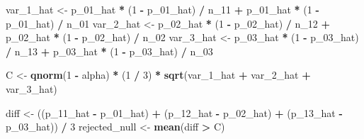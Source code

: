 \documentclass[
]{article}
\newenvironment{Shaded}{\begin{snugshade}}{\end{snugshade}}
\newcommand{\DecValTok}[1]{\textcolor[rgb]{0.00,0.00,0.81}{#1}}
\newcommand{\KeywordTok}[1]{\textcolor[rgb]{0.13,0.29,0.53}{\textbf{#1}}}
\newcommand{\NormalTok}[1]{#1}
\newcommand{\OperatorTok}[1]{\textcolor[rgb]{0.81,0.36,0.00}{\textbf{#1}}}
\newcommand{\StringTok}[1]{\textcolor[rgb]{0.31,0.60,0.02}{#1}}
\begin{document}
\begin{Shaded}
\begin{Highlighting}[]
\NormalTok{var_}\DecValTok{1}\NormalTok{_hat <-}\StringTok{ }\NormalTok{p_}\DecValTok{01}\NormalTok{_hat }\OperatorTok{*}\StringTok{ }\NormalTok{(}\DecValTok{1} \OperatorTok{-}\StringTok{ }\NormalTok{p_}\DecValTok{01}\NormalTok{_hat) }\OperatorTok{/}\StringTok{ }\NormalTok{n_}\DecValTok{11} \OperatorTok{+}\StringTok{ }\NormalTok{p_}\DecValTok{01}\NormalTok{_hat }\OperatorTok{*}\StringTok{ }\NormalTok{(}\DecValTok{1} \OperatorTok{-}\StringTok{ }\NormalTok{p_}\DecValTok{01}\NormalTok{_hat) }\OperatorTok{/}\StringTok{ }\NormalTok{n_}\DecValTok{01}
\NormalTok{var_}\DecValTok{2}\NormalTok{_hat <-}\StringTok{ }\NormalTok{p_}\DecValTok{02}\NormalTok{_hat }\OperatorTok{*}\StringTok{ }\NormalTok{(}\DecValTok{1} \OperatorTok{-}\StringTok{ }\NormalTok{p_}\DecValTok{02}\NormalTok{_hat) }\OperatorTok{/}\StringTok{ }\NormalTok{n_}\DecValTok{12} \OperatorTok{+}\StringTok{ }\NormalTok{p_}\DecValTok{02}\NormalTok{_hat }\OperatorTok{*}\StringTok{ }\NormalTok{(}\DecValTok{1} \OperatorTok{-}\StringTok{ }\NormalTok{p_}\DecValTok{02}\NormalTok{_hat) }\OperatorTok{/}\StringTok{ }\NormalTok{n_}\DecValTok{02}
\NormalTok{var_}\DecValTok{3}\NormalTok{_hat <-}\StringTok{ }\NormalTok{p_}\DecValTok{03}\NormalTok{_hat }\OperatorTok{*}\StringTok{ }\NormalTok{(}\DecValTok{1} \OperatorTok{-}\StringTok{ }\NormalTok{p_}\DecValTok{03}\NormalTok{_hat) }\OperatorTok{/}\StringTok{ }\NormalTok{n_}\DecValTok{13} \OperatorTok{+}\StringTok{ }\NormalTok{p_}\DecValTok{03}\NormalTok{_hat }\OperatorTok{*}\StringTok{ }\NormalTok{(}\DecValTok{1} \OperatorTok{-}\StringTok{ }\NormalTok{p_}\DecValTok{03}\NormalTok{_hat) }\OperatorTok{/}\StringTok{ }\NormalTok{n_}\DecValTok{03}

\NormalTok{C <-}\StringTok{ }\KeywordTok{qnorm}\NormalTok{(}\DecValTok{1} \OperatorTok{-}\StringTok{ }\NormalTok{alpha) }\OperatorTok{*}\StringTok{ }\NormalTok{(}\DecValTok{1} \OperatorTok{/}\StringTok{ }\DecValTok{3}\NormalTok{) }\OperatorTok{*}\StringTok{ }\KeywordTok{sqrt}\NormalTok{(var_}\DecValTok{1}\NormalTok{_hat }\OperatorTok{+}\StringTok{ }\NormalTok{var_}\DecValTok{2}\NormalTok{_hat }\OperatorTok{+}\StringTok{ }\NormalTok{var_}\DecValTok{3}\NormalTok{_hat)}

\NormalTok{diff <-}\StringTok{ }\NormalTok{((p_}\DecValTok{11}\NormalTok{_hat }\OperatorTok{-}\StringTok{ }\NormalTok{p_}\DecValTok{01}\NormalTok{_hat) }\OperatorTok{+}\StringTok{ }\NormalTok{(p_}\DecValTok{12}\NormalTok{_hat }\OperatorTok{-}\StringTok{ }\NormalTok{p_}\DecValTok{02}\NormalTok{_hat) }\OperatorTok{+}\StringTok{ }\NormalTok{(p_}\DecValTok{13}\NormalTok{_hat }\OperatorTok{-}\StringTok{ }\NormalTok{p_}\DecValTok{03}\NormalTok{_hat)) }\OperatorTok{/}\StringTok{ }\DecValTok{3}
\NormalTok{rejected_null <-}\StringTok{ }\KeywordTok{mean}\NormalTok{(diff }\OperatorTok{>}\StringTok{ }\NormalTok{C)}
\end{Highlighting}
\end{Shaded}
\end{document}
